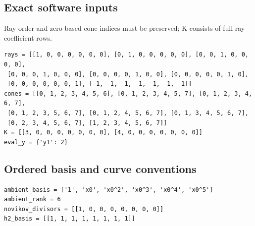 \documentclass[10pt,a4paper]{article}
\begin{document}
\subsection*{Exact software inputs}
Ray order and zero-based cone indices must be preserved; K consists of full ray-coefficient rows.
\begin{lstlisting}
rays = [[1, 0, 0, 0, 0, 0, 0], [0, 1, 0, 0, 0, 0, 0], [0, 0, 1, 0, 0, 0, 0],
 [0, 0, 0, 1, 0, 0, 0], [0, 0, 0, 0, 1, 0, 0], [0, 0, 0, 0, 0, 1, 0],
 [0, 0, 0, 0, 0, 0, 1], [-1, -1, -1, -1, -1, -1, -1]]
cones = [[0, 1, 2, 3, 4, 5, 6], [0, 1, 2, 3, 4, 5, 7], [0, 1, 2, 3, 4, 6, 7],
 [0, 1, 2, 3, 5, 6, 7], [0, 1, 2, 4, 5, 6, 7], [0, 1, 3, 4, 5, 6, 7],
 [0, 2, 3, 4, 5, 6, 7], [1, 2, 3, 4, 5, 6, 7]]
K = [[3, 0, 0, 0, 0, 0, 0, 0], [4, 0, 0, 0, 0, 0, 0, 0]]
eval_y = {'y1': 2}
\end{lstlisting}
\subsection*{Ordered basis and curve conventions}
\begin{lstlisting}
ambient_basis = ['1', 'x0', 'x0^2', 'x0^3', 'x0^4', 'x0^5']
ambient_rank = 6
novikov_divisors = [[1, 0, 0, 0, 0, 0, 0, 0]]
h2_basis = [[1, 1, 1, 1, 1, 1, 1, 1]]
\end{lstlisting}
\end{document}
